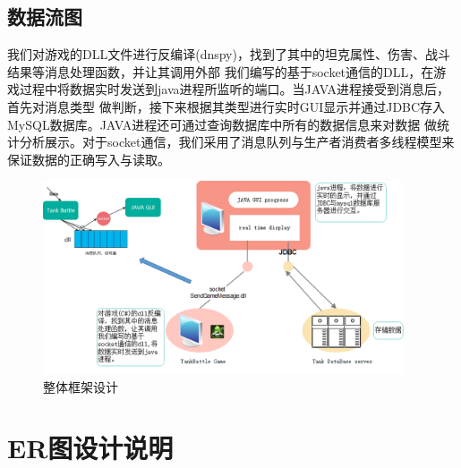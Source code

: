 \documentclass[UTF8, a4paper]{ctexart}
\begin{document}
\subsection{数据流图}
  我们对游戏的DLL文件进行反编译(dnspy)，找到了其中的坦克属性、伤害、战斗结果等消息处理函数，并让其调用外部
  我们编写的基于socket通信的DLL，在游戏过程中将数据实时发送到java进程所监听的端口。当JAVA进程接受到消息后，首先对消息类型
  做判断，接下来根据其类型进行实时GUI显示并通过JDBC存入MySQL数据库。JAVA进程还可通过查询数据库中所有的数据信息来对数据
  做统计分析展示。对于socket通信，我们采用了消息队列与生产者消费者多线程模型来保证数据的正确写入与读取。
  \begin{figure}[H] %
    \centering
    \includegraphics[width=0.95\textwidth]{dataflow.png}
    \caption{整体框架设计}
    \label{fig:chap1:structure}
  \end{figure}
\section{ER图设计说明}
\end{document}
